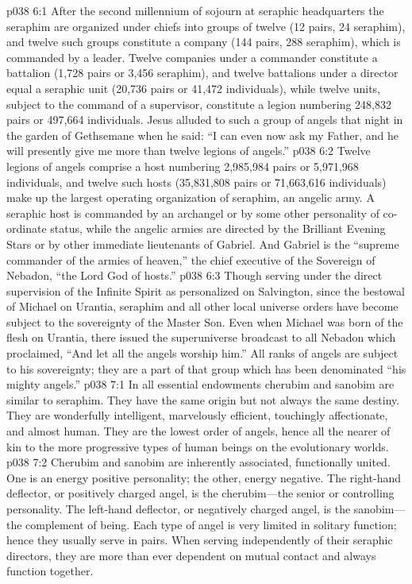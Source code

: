 \vs p038 6:1 After the second millennium of sojourn at seraphic headquarters the seraphim are organized under chiefs into groups of twelve (12 pairs, 24 seraphim), and twelve such groups constitute a company (144 pairs, 288 seraphim), which is commanded by a leader. Twelve companies under a commander constitute a battalion (1,728 pairs or 3,456 seraphim), and twelve battalions under a director equal a seraphic unit (20,736 pairs or 41,472 individuals), while twelve units, subject to the command of a supervisor, constitute a legion numbering 248,832 pairs or 497,664 individuals. Jesus alluded to such a group of angels that night in the garden of Gethsemane when he said: “I can even now ask my Father, and he will presently give me more than twelve legions of angels.”
\vs p038 6:2 Twelve legions of angels comprise a host numbering 2,985,984 pairs or 5,971,968 individuals, and twelve such hosts (35,831,808 pairs or 71,663,616 individuals) make up the largest operating organization of seraphim, an angelic army. A seraphic host is commanded by an archangel or by some other personality of co\hyp{}ordinate status, while the angelic armies are directed by the Brilliant Evening Stars or by other immediate lieutenants of Gabriel. And Gabriel is the “supreme commander of the armies of heaven,” the chief executive of the Sovereign of Nebadon, “the Lord God of hosts.”
\vs p038 6:3 Though serving under the direct supervision of the Infinite Spirit as personalized on Salvington, since the bestowal of Michael on Urantia, seraphim and all other local universe orders have become subject to the sovereignty of the Master Son. Even when Michael was born of the flesh on Urantia, there issued the superuniverse broadcast to all Nebadon which proclaimed, “And let all the angels worship him.” All ranks of angels are subject to his sovereignty; they are a part of that group which has been denominated “his mighty angels.”\plusone
{}
\vs p038 7:1 In all essential endowments cherubim and sanobim are similar to seraphim. They have the same origin but not always the same destiny. They are wonderfully intelligent, marvelously efficient, touchingly affectionate, and almost human. They are the lowest order of angels, hence all the nearer of kin to the more progressive types of human beings on the evolutionary worlds.
\vs p038 7:2 Cherubim and sanobim are inherently associated, functionally united. One is an energy positive personality; the other, energy negative. The right\hyp{}hand deflector, or positively charged angel, is the cherubim---the senior or controlling personality. The left\hyp{}hand deflector, or negatively charged angel, is the sanobim---the complement of being. Each type of angel is very limited in solitary function; hence they usually serve in pairs. When serving independently of their seraphic directors, they are more than ever dependent on mutual contact and always function together.
